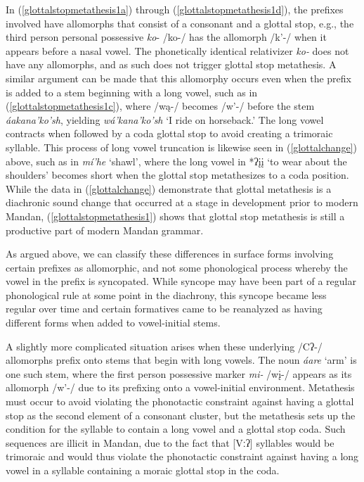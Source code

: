 In (\ref{glottalstopmetathesis1a}) through (\ref{glottalstopmetathesis1d}), the prefixes involved have allomorphs that consist of a consonant and a glottal stop, e.g., the third person personal possessive \textit{ko}- /ko-/ has the allomorph /k'-/ when it appears before a nasal vowel. The phonetically identical relativizer \textit{ko-} does not have any allomorphs, and as such does not trigger glottal stop metathesis. A similar argument can be made that this allomorphy occurs even when the prefix is added to a stem beginning with a long vowel, such as in (\ref{glottalstopmetathesis1c}), where /wą-/ becomes /w'-/ before the stem \textit{áakana'ko'sh}, yielding \textit{wá'kana'ko'sh} `I ride on horseback.' The long vowel contracts when followed by a coda glottal stop to avoid creating a trimoraic syllable. This process of long vowel truncation is likewise seen in (\ref{glottalchange}) above, such as in \textit{mí'he} `shawl', where the long vowel in *ʔįį `to wear about the shoulders' becomes short when the glottal stop metathesizes to a coda position. While the data in (\ref{glottalchange}) demonstrate that glottal metathesis is a diachronic sound change that occurred at a stage in development prior to modern Mandan, (\ref{glottalstopmetathesis1}) shows that glottal stop metathesis is still a productive part of modern Mandan grammar.

As argued above, we can classify these differences in surface forms involving certain prefixes as allomorphic, and not some phonological process whereby the vowel in the prefix is syncopated. While syncope may have been part of a regular phonological rule at some point in the diachrony, this syncope became less regular over time and certain formatives came to be reanalyzed as having different forms when added to vowel-initial stems.


A slightly more complicated situation arises when these underlying /Cʔ-/ allomorphs prefix onto stems that begin with long vowels. The noun \textit{áare} `arm' is one such stem, where the first person possessive marker \textit{mi-} /wį-/ appears as its allomorph /w'-/ due to its prefixing onto a vowel-initial environment. Metathesis must occur to avoid violating the phonotactic constraint against having a glottal stop as the second element of a consonant cluster, but the metathesis sets up the condition for the syllable to contain a long vowel and a glottal stop coda. Such sequences are illicit in Mandan, due to the fact that [Vːʔ] syllables would be trimoraic and would thus violate the phonotactic constraint against having a long vowel in a syllable containing a moraic glottal stop in the coda.

